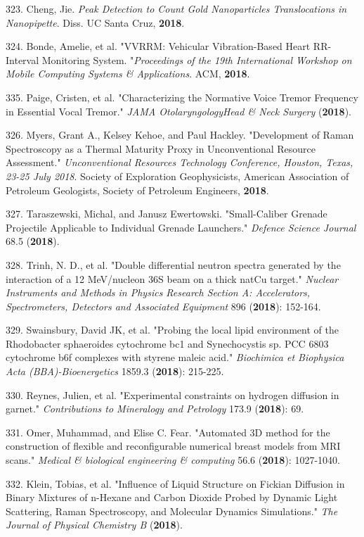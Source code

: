 323. Cheng, Jie. \textit{Peak Detection to Count Gold Nanoparticles Translocations in Nanopipette}. Diss. UC Santa Cruz, \textbf{2018}. 

324. Bonde, Amelie, et al. "VVRRM: Vehicular Vibration-Based Heart RR-Interval Monitoring System. "\textit{Proceedings of the 19th International Workshop on Mobile Computing Systems \& Applications}. ACM, \textbf{2018}. 

335. Paige, Cristen, et al. "Characterizing the Normative Voice Tremor Frequency in Essential Vocal Tremor." \textit{JAMA Otolaryngology\textendash{}Head \& Neck Surgery} (\textbf{2018}). 

326. Myers, Grant A., Kelsey Kehoe, and Paul Hackley. "Development of Raman Spectroscopy as a Thermal Maturity Proxy in Unconventional Resource Assessment." \textit{Unconventional Resources Technology Conference, Houston, Texas, 23-25 July 2018}. Society of Exploration Geophysicists, American Association of Petroleum Geologists, Society of Petroleum Engineers, \textbf{2018}.

327. Taraszewski, Michal, and Janusz Ewertowski. "Small-Caliber Grenade Projectile Applicable to Individual Grenade Launchers." \textit{Defence Science Journal} 68.5 (\textbf{2018}). 

328. Trinh, N. D., et al. "Double differential neutron spectra generated by the interaction of a 12 MeV/nucleon 36S beam on a thick natCu target." \textit{Nuclear Instruments and Methods in Physics Research Section A: Accelerators, Spectrometers, Detectors and Associated Equipment} 896 (\textbf{2018}): 152-164.

329. Swainsbury, David JK, et al. "Probing the local lipid environment of the Rhodobacter sphaeroides cytochrome bc1 and Synechocystis sp. PCC 6803 cytochrome b6f complexes with styrene maleic acid." \textit{Biochimica et Biophysica Acta (BBA)-Bioenergetics} 1859.3 (\textbf{2018}): 215-225.

330. Reynes, Julien, et al. "Experimental constraints on hydrogen diffusion in garnet." \textit{Contributions to Mineralogy and Petrology} 173.9 (\textbf{2018}): 69.

331. Omer, Muhammad, and Elise C. Fear. "Automated 3D method for the construction of flexible and reconfigurable numerical breast models from MRI scans." \textit{Medical \& biological engineering \& computing} 56.6 (\textbf{2018}): 1027-1040.

332. Klein, Tobias, et al. "Influence of Liquid Structure on Fickian Diffusion in Binary Mixtures of n-Hexane and Carbon Dioxide Probed by Dynamic Light Scattering, Raman Spectroscopy, and Molecular Dynamics Simulations." \textit{The Journal of Physical Chemistry B} (\textbf{2018}).

